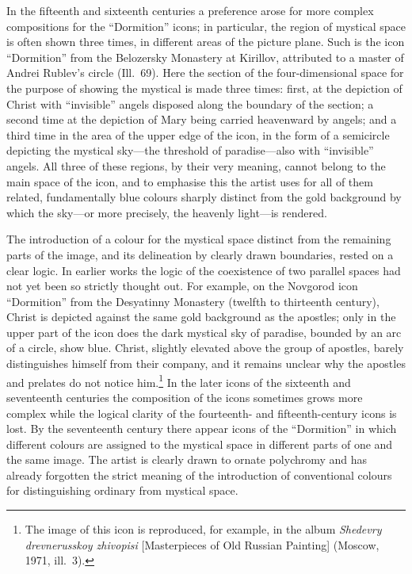 In the fifteenth and sixteenth centuries a preference arose for more complex compositions
for the ``Dormition'' icons; in particular, the region of mystical space is often shown
three times, in different areas of the picture plane.  Such is the icon ``Dormition'' from
the Belozersky Monastery at Kirillov, attributed to a master of Andrei Rublev's circle
(Ill.~69).  Here the section of the four-dimensional space for the purpose of showing
the mystical is made three times: first, at the depiction of Christ with ``invisible''
angels disposed along the boundary of the section; a second time at the depiction of Mary
being carried heavenward by angels; and a third time in the area of the upper edge of the
icon, in the form of a semicircle depicting the mystical sky---the threshold of
paradise---also with ``invisible'' angels.  All three of these regions, by their very
meaning, cannot belong to the main space of the icon, and to emphasise this the artist
uses for all of them related, fundamentally blue colours sharply distinct from the gold
background by which the sky---or more precisely, the heavenly light---is rendered.

The introduction of a colour for the mystical space distinct from the remaining parts of
the image, and its delineation by clearly drawn boundaries, rested on a clear logic.  In
earlier works the logic of the coexistence of two parallel spaces had not yet been so
strictly thought out.  For example, on the Novgorod icon ``Dormition'' from the Desyatinny
Monastery (twelfth to thirteenth century), Christ is depicted against the same gold
background as the apostles; only in the upper part of the icon does the dark mystical sky
of paradise, bounded by an arc of a circle, show blue.  Christ, slightly elevated above
the group of apostles, barely distinguishes himself from their company, and it remains
unclear why the apostles and prelates do not notice him.\footnote{The image of this icon
  is reproduced, for example, in the album \emph{Shedevry drevnerusskoy zhivopisi}
  [Masterpieces of Old Russian Painting] (Moscow, 1971, ill.~3).}  In the later icons of
the sixteenth and seventeenth centuries the composition of the icons sometimes grows more
complex while the logical clarity of the fourteenth- and fifteenth-century icons is lost.
By the seventeenth century there appear icons of the ``Dormition'' in which different
colours are assigned to the mystical space in different parts of one and the same image.
The artist is clearly drawn to ornate polychromy and has already forgotten the strict
meaning of the introduction of conventional colours for distinguishing ordinary from
mystical space.


